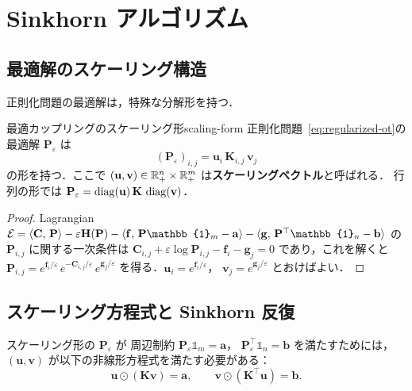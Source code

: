 \section{Sinkhorn アルゴリズム}\label{sec:sinkhorn}

\subsection{最適解のスケーリング構造}\label{subsec:scaling-structure}

正則化問題の最適解は，特殊な分解形を持つ．

\begin{proposition}{最適カップリングのスケーリング形}{scaling-form}
正則化問題~\eqref{eq:regularized-ot}の最適解
$\mathbf{P}_\varepsilon$ は
\begin{equation}\label{eq:scaling-form}
  (\mathbf{P}_\varepsilon)_{i,j} = \mathbf{u}_i\, \mathbf{K}_{i,j}\, \mathbf{v}_j
\end{equation}
の形を持つ．ここで $(\mathbf{u}, \mathbf{v}) \in \mathbb{R}^n_{+} \times \mathbb{R}^m_{+}$
は\textbf{スケーリングベクトル}と呼ばれる．
行列の形では $\mathbf{P}_\varepsilon = \operatorname{diag}(\mathbf{u})\, \mathbf{K}\, \operatorname{diag}(\mathbf{v})$．
\end{proposition}

\begin{proof}
Lagrangian
$\mathcal{E} = \inner{\mathbf{C}}{\mathbf{P}} - \varepsilon \mathbf{H}(\mathbf{P})
- \inner{\mathbf{f}}{\mathbf{P}\mathbb{1}_m - \mathbf{a}}
- \inner{\mathbf{g}}{\mathbf{P}^\top \mathbb{1}_n - \mathbf{b}}$
の $\mathbf{P}_{i,j}$ に関する一次条件は
$\mathbf{C}_{i,j} + \varepsilon \log \mathbf{P}_{i,j} - \mathbf{f}_i - \mathbf{g}_j = 0$
であり，これを解くと
$\mathbf{P}_{i,j} = e^{\mathbf{f}_i/\varepsilon}\,
e^{-\mathbf{C}_{i,j}/\varepsilon}\, e^{\mathbf{g}_j/\varepsilon}$
を得る．$\mathbf{u}_i = e^{\mathbf{f}_i/\varepsilon}$，
$\mathbf{v}_j = e^{\mathbf{g}_j/\varepsilon}$ とおけばよい．
\end{proof}

\subsection{スケーリング方程式と Sinkhorn 反復}\label{subsec:sinkhorn-iterations}

スケーリング形の $\mathbf{P}_\varepsilon$ が
周辺制約 $\mathbf{P}_\varepsilon \mathbb{1}_m = \mathbf{a}$，
$\mathbf{P}_\varepsilon^\top \mathbb{1}_n = \mathbf{b}$ を満たすためには，
$(\mathbf{u}, \mathbf{v})$ が以下の非線形方程式を満たす必要がある：
\begin{equation}\label{eq:scaling-equations}
  \mathbf{u} \odot (\mathbf{K}\mathbf{v}) = \mathbf{a},
  \qquad
  \mathbf{v} \odot (\mathbf{K}^\top \mathbf{u}) = \mathbf{b}.
\end{equation}

